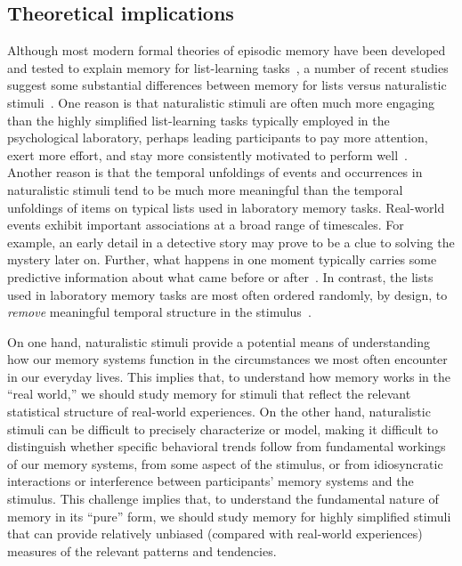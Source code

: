 \documentclass[11pt]{article}
\begin{document}

\subsection*{Theoretical implications}

Although most modern formal theories of episodic memory have been developed and
tested to explain memory for list-learning tasks~\citep{Kaha20}, a number of
recent studies suggest some substantial differences between memory for lists
versus naturalistic stimuli~\citep[e.g., real-world experiences, narratives,
films, etc.;][]{NastEtal20, HeusEtal21, Mann21a, LeeEtal20}. One reason is that
naturalistic stimuli are often much more engaging than the highly simplified
list-learning tasks typically employed in the psychological laboratory, perhaps
leading participants to pay more attention, exert more effort, and stay more
consistently motivated to perform well~\citep{NastEtal20}. Another reason is
that the temporal unfoldings of events and occurrences in naturalistic stimuli
tend to be much more meaningful than the temporal unfoldings of items on
typical lists used in laboratory memory tasks. Real-world events exhibit
important associations at a broad range of timescales. For example, an early
detail in a detective story may prove to be a clue to solving the mystery later
on. Further, what happens in one moment typically carries some predictive
information about what came before or after~\citep{XuEtal23}. In contrast, the
lists used in laboratory memory tasks are most often ordered randomly, by
design, to \textit{remove} meaningful temporal structure in the
stimulus~\citep{Kaha12}.

On one hand, naturalistic stimuli provide a potential means of understanding
how our memory systems function in the circumstances we most often encounter in
our everyday lives. This implies that, to understand how memory works in the
``real world,'' we should study memory for stimuli that reflect the relevant
statistical structure of real-world experiences. On the other hand,
naturalistic stimuli can be difficult to precisely characterize or model,
making it difficult to distinguish whether specific behavioral trends follow
from fundamental workings of our memory systems, from some aspect of the
stimulus, or from idiosyncratic interactions or interference between
participants' memory systems and the stimulus. This challenge implies that, to
understand the fundamental nature of memory in its ``pure'' form, we should
study memory for highly simplified stimuli that can provide relatively unbiased
(compared with real-world experiences) measures of the relevant patterns and
tendencies.
\end{document}
